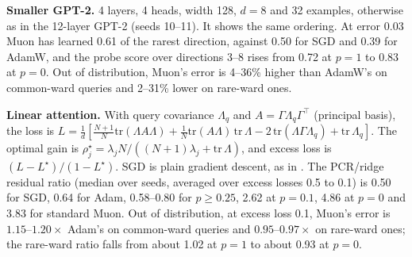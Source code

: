 \textbf{Smaller GPT-2.} 4 layers, 4 heads, width 128, $d = 8$ and 32 examples, otherwise as in the 12-layer GPT-2 (seeds 10--11). It shows the same ordering. At error 0.03 Muon has learned 0.61 of the rarest direction, against 0.50 for SGD and 0.39 for AdamW, and the probe score over directions 3--8 rises from 0.72 at $p=1$ to 0.83 at $p=0$. Out of distribution, Muon's error is 4--36\% higher than AdamW's on common-ward queries and 2--31\% lower on rare-ward ones.

\textbf{Linear attention.} With query covariance $\Lambda_q$ and $A = \Gamma\Lambda_q\Gamma^\top$ (principal basis), the loss is $L = \frac1d[\frac{N+1}{N}\mathrm{tr}(\Lambda A\Lambda) + \frac1N\mathrm{tr}(A\Lambda)\,\mathrm{tr}\,\Lambda - 2\,\mathrm{tr}(\Lambda\Gamma\Lambda_q) + \mathrm{tr}\,\Lambda_q]$. The optimal gain is $\rho_j^\star = \lambda_j N/((N+1)\lambda_j + \mathrm{tr}\,\Lambda)$, and excess loss is $(L-L^\star)/(1-L^\star)$. SGD is plain gradient descent, as in \citet{zhang2025training}. The PCR/ridge residual ratio (median over seeds, averaged over excess losses 0.5 to 0.1) is 0.50 for SGD, 0.64 for Adam, 0.58--0.80 for $p \ge 0.25$, 2.62 at $p = 0.1$, 4.86 at $p = 0$ and 3.83 for standard Muon. Out of distribution, at excess loss 0.1, Muon's error is $1.15$--$1.20\times$ Adam's on common-ward queries and $0.95$--$0.97\times$ on rare-ward ones; the rare-ward ratio falls from about 1.02 at $p = 1$ to about 0.93 at $p = 0$.
